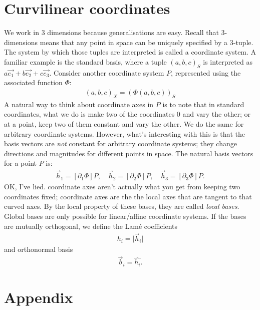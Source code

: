 \documentclass{article}
\theoremstyle{definition}
\begin{document}
\section{Curvilinear coordinates}
We work in 3 dimensions because generalisations are easy. Recall that 3-dimensions means that any point in space can be uniquely specified by a 3-tuple. The system by which those tuples are interpreted is called a coordinate system. A familiar example is the standard basis, where a tuple $(a,b,c)_S$ is interpreted as $a\vec{e_1}+b\vec{e_2}+c\vec{e_3}$. Consider another coordinate system $P$, represented using the associated function $\Phi$:
\begin{align*}
	(a,b,c)_X=(\Phi(a,b,c))_S
\end{align*}
A natural way to think about coordinate axes in $P$ is to note that in standard coordinates, what we do is make two of the coordinates 0 and vary the other; or at a point, keep two of them constant and vary the other. We do the same for arbitrary coordinate systems. However, what's interesting with this is that the basis vectors are \emph{not} constant for arbitrary coordinate systems; they change directions and magnitudes for different points in space. The natural basis vectors for a point $P$ is:
\begin{align*}
	\vec h_1=[\partial_1\Phi]P,\quad\vec h_2=[\partial_2\Phi]P,\quad\vec h_3=[\partial_3\Phi]P.
\end{align*}
OK, I've lied. coordinate axes aren't actually what you get from keeping two coordinates fixed; coordinate axes are the the local axes that are tangent to that curved axes.
By the local property of these bases, they are called \emph{local bases}. Global bases are only possible for linear/affine coordinate systems. If the bases are mutually orthogonal, we define the Lamé coefficients
\begin{align*}
	h_i=\lvert\vec h_i\rvert
\end{align*}
and orthonormal basis
\begin{align*}
	\vec b_i=\hat{h_i}.
\end{align*}

\newpage
\appendix
\section{Appendix}
\end{document}
